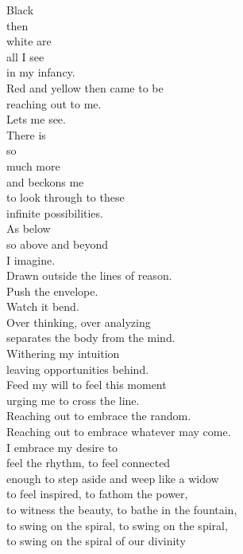 \documentclass[12pt,twoside]{report}
\begin{document}
\newpage
\begin{flushright}
\footnotesize{\noindent 
Black \\
then \\
white are \\
all I see \\
in my infancy. \\
Red and yellow then came to be \\
reaching out to me. \\
Lets me see. \\
\vspace{0.2 cm}
There is \\
so \\
much more \\
and beckons me \\
to look through to these \\
infinite possibilities. \\
As below \\
so above and beyond \\
I imagine. \\
Drawn outside the lines of reason. \\
Push the envelope. \\
Watch it bend. \\
\vspace{0.2 cm}
Over thinking, over analyzing \\
separates the body from the mind. \\
Withering my intuition \\
leaving opportunities behind. \\
\vspace{0.2 cm}
Feed my will to feel this moment \\
urging me to cross the line. \\
Reaching out to embrace the random. \\
Reaching out to embrace whatever may come. \\
\vspace{0.2 cm}
I embrace my desire to \\
feel the rhythm, to feel connected \\
enough to step aside and weep like a widow \\
to feel inspired, to fathom the power, \\
to witness the beauty, to bathe in the fountain, \\
to swing on the spiral, to swing on the spiral, \\
to swing on the spiral of our divinity \\
}
\end{flushright}
\end{document}
